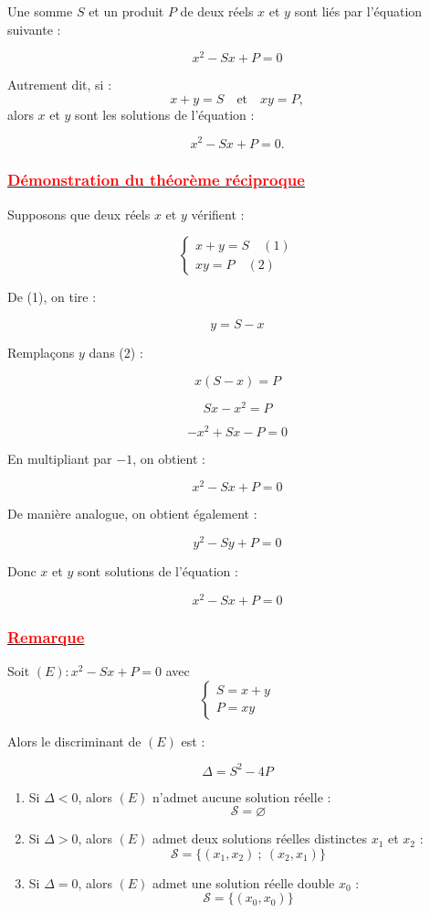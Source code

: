 \documentclass[12pt,a4paper]{article}
\newcounter{solution}
\begin{document}
Une somme $S$ et un produit $P$ de deux réels $x$ et $y$ sont liés par l’équation suivante :

\[
\boxed{x^2 - Sx + P = 0}
\]

Autrement dit, si :
\[
x + y = S
\quad \text{et} \quad
xy = P,
\]
alors $x$ et $y$ sont les solutions de l’équation :

\[
x^2 - Sx + P = 0.
\]
\subsubsection*{\underline{\textcolor{red}{Démonstration du théorème réciproque}}}

Supposons que deux réels $x$ et $y$ vérifient :

\[
\begin{cases}
x + y = S \quad (1) \\
xy = P \quad (2)
\end{cases}
\]

\medskip

De (1), on tire :

\[
y = S - x
\]

Remplaçons $y$ dans (2) :

\[
x(S - x) = P
\]

\[
Sx - x^2 = P
\]

\[
-x^2 + Sx - P = 0
\]

En multipliant par $-1$, on obtient :

\[
x^2 - Sx + P = 0
\]

\bigskip

De manière analogue, on obtient également :

\[
y^2 - Sy + P = 0
\]

\bigskip

Donc $x$ et $y$ sont solutions de l’équation :

\[
\boxed{x^2 - Sx + P = 0}
\]
\subsubsection*{\underline{\textcolor{red}{Remarque}}}

Soit $(E) : x^2 - Sx + P = 0$ avec
\[
\begin{cases}
S = x + y \\
P = xy
\end{cases}
\]

Alors le discriminant de $(E)$ est :

\[
\Delta = S^2 - 4P
\]

\begin{enumerate}
    \item Si $\Delta < 0$, alors $(E)$ n’admet aucune solution réelle :
    \[
    \mathcal{S} = \varnothing
    \]

    \item Si $\Delta > 0$, alors $(E)$ admet deux solutions réelles distinctes 
    $x_1$ et $x_2$ :
    \[
    \mathcal{S} = \{(x_1,x_2)\ ;\ (x_2,x_1)\}
    \]

    \item Si $\Delta = 0$, alors $(E)$ admet une solution réelle double $x_0$ :
    \[
    \mathcal{S} = \{(x_0,x_0)\}
    \]
\end{enumerate}
\end{document}
